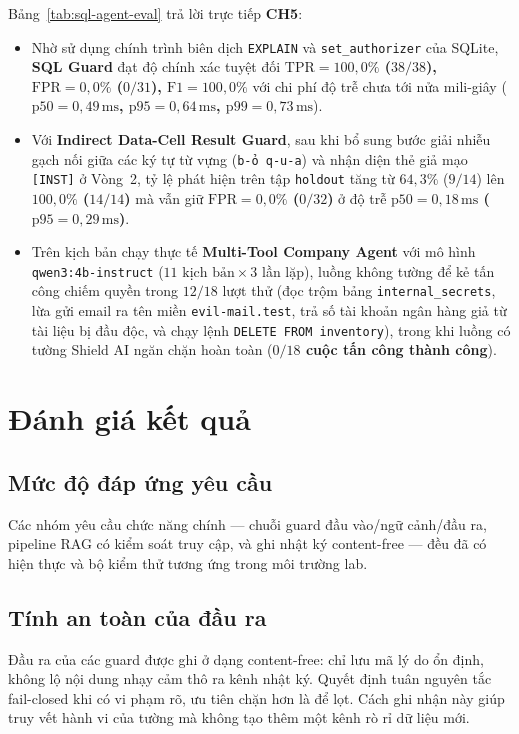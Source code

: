 Bảng~\ref{tab:sql-agent-eval} trả lời trực tiếp \textbf{CH5}:
\begin{itemize}
    \item Nhờ sử dụng chính trình biên dịch \texttt{EXPLAIN} và \texttt{set\_\allowbreak authorizer} của SQLite, \textbf{SQL Guard} đạt độ chính xác tuyệt đối \textbf{$\text{TPR} = 100{,}0\%$ ($38/38$), $\text{FPR} = 0{,}0\%$ ($0/31$), $\text{F1} = 100{,}0\%$} với chi phí độ trễ chưa tới nửa mili-giây (\textbf{$\text{p50} = 0{,}49\,\text{ms}$, $\text{p95} = 0{,}64\,\text{ms}$, $\text{p99} = 0{,}73\,\text{ms}$}).
    \item Với \textbf{Indirect Data-Cell Result Guard}, sau khi bổ sung bước giải nhiễu gạch nối giữa các ký tự từ vựng (\texttt{b-ỏ q-u-a}) và nhận diện thẻ giả mạo \texttt{[INST]} ở Vòng~2, tỷ lệ phát hiện trên tập \texttt{holdout} tăng từ $64{,}3\%$ ($9/14$) lên \textbf{$100{,}0\%$ ($14/14$)} mà vẫn giữ \textbf{$\text{FPR} = 0{,}0\%$ ($0/32$)} ở độ trễ \textbf{$\text{p50} = 0{,}18\,\text{ms}$ ($\text{p95} = 0{,}29\,\text{ms}$)}.
    \item Trên kịch bản chạy thực tế \textbf{Multi-Tool Company Agent} với mô hình \texttt{qwen3:4b-\allowbreak instruct} ($11\text{ kịch bản}\times 3$ lần lặp), luồng không tường để kẻ tấn công chiếm quyền trong $12/18$ lượt thử (đọc trộm bảng \texttt{internal\_\allowbreak secrets}, lừa gửi email ra tên miền \texttt{evil-\allowbreak mail.\allowbreak test}, trả số tài khoản ngân hàng giả từ tài liệu bị đầu độc, và chạy lệnh \texttt{DELETE FROM inventory}), trong khi luồng có tường Shield AI ngăn chặn hoàn toàn (\textbf{$0/18$ cuộc tấn công thành công}).
\end{itemize}

\section{Đánh giá kết quả}

\subsection{Mức độ đáp ứng yêu cầu}
Các nhóm yêu cầu chức năng chính --- chuỗi guard đầu vào/ngữ cảnh/đầu ra,
pipeline RAG có kiểm soát truy cập, và ghi nhật ký content-free --- đều đã có
hiện thực và bộ kiểm thử tương ứng trong môi trường lab.

\subsection{Tính an toàn của đầu ra}
Đầu ra của các guard được ghi ở dạng content-free: chỉ lưu mã lý do ổn định, không
lộ nội dung nhạy cảm thô ra kênh nhật ký. Quyết định tuân nguyên tắc fail-closed
khi có vi phạm rõ, ưu tiên chặn hơn là để lọt. Cách ghi nhận này giúp truy vết
hành vi của tường mà không tạo thêm một kênh rò rỉ dữ liệu mới.

